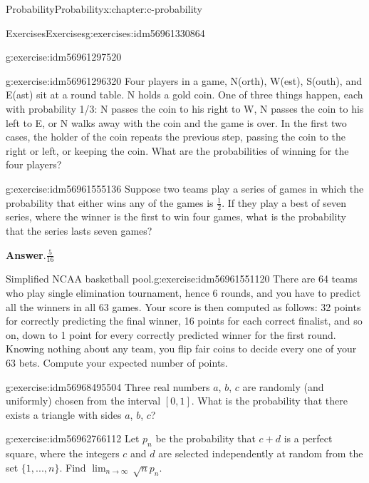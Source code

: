 \documentclass[twoside,10pt,]{book}
\newcommand{\blocktitlefont}{\relax}
\numberwithin{equation}{section}
\begin{document}
\begin{chapterptx}{Probability}{}{Probability}{}{}{x:chapter:c-probability}
\begin{exercises-section}{Exercises}{}{Exercises}{}{}{g:exercises:idm56961330864}
\begin{divisionexercise}{3}{}{}{g:exercise:idm56961297520}
\end{divisionexercise}%
\begin{divisionexercise}{4}{}{}{g:exercise:idm56961296320}%
Four players in a game, N(orth), W(est), S(outh), and E(ast) sit at a round table. N holds a gold coin. One of three things happen, each with probability 1\slash{}3: N passes the coin to his right to W, N passes the coin to his left to E, or N walks away with the coin and the game is over. In the first two cases, the holder of the coin repeats the previous step, passing the coin to the right or left, or keeping the coin. What are the probabilities of winning for the four players?%
\end{divisionexercise}%
\begin{divisionexercise}{5}{}{}{g:exercise:idm56961555136}%
Suppose two teams play a series of games in which the probability that either wins any of the games is \(\frac{1}{2}\).  If they play a best of seven series, where the winner is the first to win four games, what is the probability that the series lasts seven games?%
\par\smallskip%
\noindent\textbf{\blocktitlefont Answer}.\hypertarget{g:answer:idm56961553424}{}\quad{}\(\frac{5}{16}\)%
\end{divisionexercise}%
\begin{divisionexercise}{6}{Simplified NCAA basketball pool.}{}{g:exercise:idm56961551120}%
There are 64 teams who play single elimination tournament, hence 6 rounds, and you have to predict all the winners in all 63 games. Your score is then computed as follows: 32 points for correctly predicting the final winner, 16 points for each correct finalist, and so on, down to 1 point for every correctly predicted winner for the first round. Knowing nothing about any team, you flip fair coins to decide every one of your 63 bets. Compute your expected number of points.%
\end{divisionexercise}%
\begin{divisionexercise}{7}{}{}{g:exercise:idm56968495504}%
Three real numbers \(a\), \(b\), \(c\) are randomly (and uniformly) chosen from the interval \([0, 1]\). What is the probability that there exists a triangle with sides \(a\), \(b\), \(c\)?%
\end{divisionexercise}%
\begin{divisionexercise}{8}{}{}{g:exercise:idm56962766112}%
Let \(p_n\) be the probability that \(c + d\) is a perfect square, where the integers \(c\) and \(d\) are selected independently at random from the set \(\{1, . . . , n\}\). Find \(\lim_{n\to \infty } \, \sqrt{n} p_n\).%

\end{divisionexercise}
\end{exercises-section}
\end{chapterptx}
\end{document}

